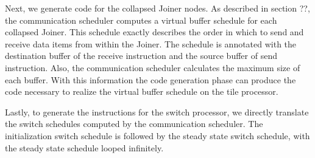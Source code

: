 Next, we generate code for the collapsed Joiner nodes.  As described
in section ??, the communication scheduler computes a virtual buffer schedule
for each collapsed Joiner.  This schedule exactly describes the order
in which to send and receive data items from within the Joiner.  The
schedule is annotated with the destination buffer of the receive
instruction and the source buffer of send instruction.  Also, the
communication scheduler calculates the maximum size of each buffer.
With this information the code generation phase can produce the code
necessary to realize the virtual buffer schedule on the tile processor.

Lastly, to generate the instructions for the switch processor, we
directly translate the switch schedules computed by the communication
scheduler.  The initialization switch schedule is followed by the steady
state switch schedule, with the steady state schedule looped infinitely.
